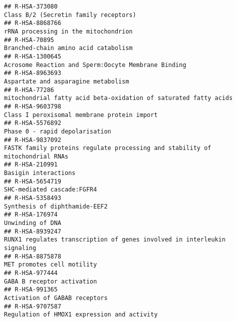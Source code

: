 \documentclass[
]{article}
\begin{document}
\begin{verbatim}
## R-HSA-373080                                                                                                 Class B/2 (Secretin family receptors)
## R-HSA-8868766                                                                                                 rRNA processing in the mitochondrion
## R-HSA-70895                                                                                                   Branched-chain amino acid catabolism
## R-HSA-1300645                                                                                  Acrosome Reaction and Sperm:Oocyte Membrane Binding
## R-HSA-8963693                                                                                                  Aspartate and asparagine metabolism
## R-HSA-77286                                                                       mitochondrial fatty acid beta-oxidation of saturated fatty acids
## R-HSA-9603798                                                                                          Class I peroxisomal membrane protein import
## R-HSA-5576892                                                                                                       Phase 0 - rapid depolarisation
## R-HSA-9837092                                                        FASTK family proteins regulate processing and stability of mitochondrial RNAs
## R-HSA-210991                                                                                                                  Basigin interactions
## R-HSA-5654719                                                                                                           SHC-mediated cascade:FGFR4
## R-HSA-5358493                                                                                                        Synthesis of diphthamide-EEF2
## R-HSA-176974                                                                                                                      Unwinding of DNA
## R-HSA-8939247                                                             RUNX1 regulates transcription of genes involved in interleukin signaling
## R-HSA-8875878                                                                                                           MET promotes cell motility
## R-HSA-977444                                                                                                            GABA B receptor activation
## R-HSA-991365                                                                                                         Activation of GABAB receptors
## R-HSA-9707587                                                                                          Regulation of HMOX1 expression and activity

\end{verbatim}
\end{document}
